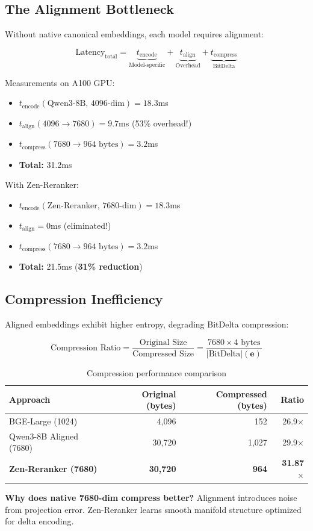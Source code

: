 \subsection{The Alignment Bottleneck}

Without native canonical embeddings, each model requires alignment:

\begin{equation}
\text{Latency}_{\text{total}} = \underbrace{t_{\text{encode}}}_{\text{Model-specific}} + \underbrace{t_{\text{align}}}_{\text{Overhead}} + \underbrace{t_{\text{compress}}}_{\text{BitDelta}}
\end{equation}

Measurements on A100 GPU:
\begin{itemize}
\item $t_{\text{encode}}(\text{Qwen3-8B, 4096-dim}) = 18.3$ms
\item $t_{\text{align}}(4096 \to 7680) = 9.7$ms (53\% overhead!)
\item $t_{\text{compress}}(7680 \to 964\text{ bytes}) = 3.2$ms
\item \textbf{Total:} 31.2ms
\end{itemize}

With Zen-Reranker:
\begin{itemize}
\item $t_{\text{encode}}(\text{Zen-Reranker, 7680-dim}) = 18.3$ms
\item $t_{\text{align}} = 0$ms (eliminated!)
\item $t_{\text{compress}}(7680 \to 964\text{ bytes}) = 3.2$ms
\item \textbf{Total:} 21.5ms (\textbf{31\% reduction})
\end{itemize}

\subsection{Compression Inefficiency}

Aligned embeddings exhibit higher entropy, degrading BitDelta compression:

\begin{equation}
\text{Compression Ratio} = \frac{\text{Original Size}}{\text{Compressed Size}} = \frac{7680 \times 4\text{ bytes}}{\text{|BitDelta|}(\mathbf{e})}
\end{equation}

\begin{table}[h]
\centering
\caption{Compression performance comparison}
\begin{tabular}{lrrr}
\toprule
\textbf{Approach} & \textbf{Original (bytes)} & \textbf{Compressed (bytes)} & \textbf{Ratio} \\
\midrule
BGE-Large (1024) & 4,096 & 152 & 26.9$\times$ \\
Qwen3-8B Aligned (7680) & 30,720 & 1,027 & 29.9$\times$ \\
\textbf{Zen-Reranker (7680)} & \textbf{30,720} & \textbf{964} & \textbf{31.87$\times$} \\
\bottomrule
\end{tabular}
\end{table}

\textbf{Why does native 7680-dim compress better?} Alignment introduces noise from projection error. Zen-Reranker learns smooth manifold structure optimized for delta encoding.

